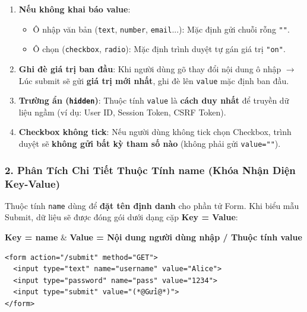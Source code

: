 \documentclass[11pt,oneside]{book}
\newcommand{\codeinline}[1]{\textcolor{accentOrange}{\texttt{#1}}}
\begin{document}
\begin{warnBox}
\begin{enumerate}[leftmargin=1.5em, itemsep=4pt, parsep=0pt]
    \item \textbf{Nếu không khai báo value}:
    \begin{itemize}[leftmargin=1.2em]
        \item Ô nhập văn bản (\codeinline{text}, \codeinline{number}, \codeinline{email}...): Mặc định gửi chuỗi rỗng \codeinline{""}.
        \item Ô chọn (\codeinline{checkbox}, \codeinline{radio}): Mặc định trình duyệt tự gán giá trị \codeinline{"on"}.
    \end{itemize}
    \item \textbf{Ghi đè giá trị ban đầu}: Khi người dùng gõ thay đổi nội dung ô nhập $\rightarrow$ Lúc submit sẽ gửi \textbf{giá trị mới nhất}, ghi đè lên \codeinline{value} mặc định ban đầu.
    \item \textbf{Trường ẩn (\codeinline{hidden})}: Thuộc tính \codeinline{value} là \textbf{cách duy nhất} để truyền dữ liệu ngầm (ví dụ: User ID, Session Token, CSRF Token).
    \item \textbf{Checkbox không tick}: Nếu người dùng không tick chọn Checkbox, trình duyệt sẽ \textbf{không gửi bất kỳ tham số nào} (không phải gửi \codeinline{value=""}).
\end{enumerate}
\end{warnBox}

\subsubsection{2. Phân Tích Chi Tiết Thuộc Tính name (Khóa Nhận Diện Key-Value)}

\begin{conceptBox}[Định Nghĩa \& Cơ Chế Cặp Key = Value]
Thuộc tính \codeinline{name} dùng để \textbf{đặt tên định danh} cho phần tử Form. Khi biểu mẫu Submit, dữ liệu sẽ được đóng gói dưới dạng cặp \textbf{Key = Value}:
\begin{center}
\textbf{\textcolor{primaryBlue}{Key} = \textcolor{accentOrange}{name}} \quad \& \quad \textbf{\textcolor{primaryBlue}{Value} = \textcolor{accentOrange}{Nội dung người dùng nhập / Thuộc tính value}}
\end{center}
\end{conceptBox}

\begin{codeWindow}
\begin{lstlisting}[language=HTML5]
<form action="/submit" method="GET">
  <input type="text" name="username" value="Alice">
  <input type="password" name="pass" value="1234">
  <input type="submit" value="(*@Gửi@*)">
</form>
\end{lstlisting}
\end{codeWindow}
\end{document}
